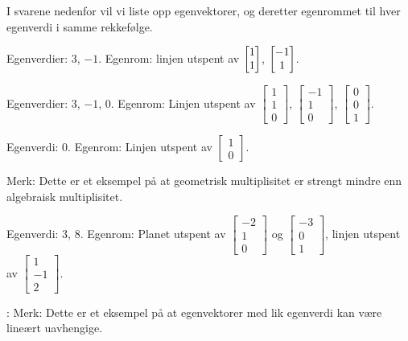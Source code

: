 \begin{losning}
I svarene nedenfor vil vi liste opp egenvektorer, og deretter egenrommet til hver egenverdi i samme rekkefølge.

\begin{punkt}
Egenverdier: 3, $-1$. Egenrom: linjen utspent av $\begin{bmatrix} 1 \\ 1 \end{bmatrix}$, $\begin{bmatrix} -1 \\ 1 \end{bmatrix}$.
\end{punkt}

\begin{punkt}
Egenverdier: 3, $-1$, 0. Egenrom: Linjen utspent av $\begin{bmatrix} 
1\\
1\\
0
\end{bmatrix}$, $\begin{bmatrix} 
-1\\
1\\
0
\end{bmatrix}$, $\begin{bmatrix} 
0\\
0\\
1
\end{bmatrix}$.

\end{punkt}

\begin{punkt}
Egenverdi: 0. Egenrom: Linjen utspent av $\begin{bmatrix} 
1\\
0
\end{bmatrix}$.

\noindent
Merk: Dette er et eksempel på at geometrisk multiplisitet er strengt mindre enn algebraisk multiplisitet.
\end{punkt}

\begin{punkt}
Egenverdi: 3, 8. Egenrom: Planet utspent av $\begin{bmatrix} 
-2\\
1\\
0
\end{bmatrix}$ og $\begin{bmatrix} 
-3\\
0\\
1
\end{bmatrix}$, linjen utspent av $\begin{bmatrix} 
1\\
-1\\
2
\end{bmatrix}$.

\noindent:
Merk: Dette er et eksempel på at egenvektorer med lik egenverdi kan være lineært uavhengige.
\end{punkt}



\end{losning}




